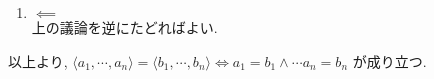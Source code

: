\begin{nmprob}
{\begin{enumerate}
    帰納法により示す.
    $n = 1$ のときは明らか.\\
    次に $\langle a_1, \cdots, a_k \rangle = \langle b_1, \cdots, b_k \rangle \implies a_1 = b_1 \land \cdots a_k = b_k$ が成り立つと仮定すると,
    \begin{align*}
        \langle a_1, \cdots, a_{k+1} \rangle = \langle b_1, \cdots, b_{k+1} \rangle &\implies \langle \langle a_1, \cdots, a_k \rangle, a_{k+1} \rangle = \langle \langle b_1, \cdots, b_k \rangle, b_{k+1} \rangle \\
        &\implies \langle a_1, \cdots, a_k \rangle = \langle b_1, \cdots, b_k \rangle \land a_{k+1} = b_{k+1}\\
        &\implies a_1 = b_1 \land \cdots a_k = b_k \land a_{k+1} = b_{k+1}
    \end{align*}
    が成り立つことから, $\langle a_1, \cdots, a_n \rangle = \langle b_1, \cdots, b_n \rangle \implies a_1 = b_1 \land \cdots a_n = b_n$ が成り立つ.\\
    (集合の集合を認めれば, (1)において元が集合でも問題ない...はず)
    \item $\impliedby$\\
    上の議論を逆にたどればよい.
\end{enumerate}
以上より, $\langle a_1, \cdots, a_n \rangle = \langle b_1, \cdots, b_n \rangle \iff a_1 = b_1 \land \cdots a_n = b_n$ が成り立つ.
}
\end{nmprob}



